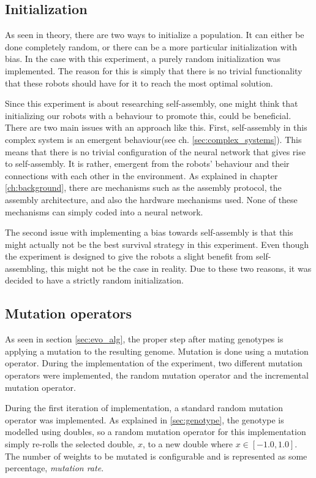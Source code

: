 \subsection{Initialization}
As seen in theory, there are two ways to initialize a population. 
It can either be done completely random, or there can be a more particular initialization with bias. 
In the case with this experiment, a purely random initialization was implemented.
The reason for this is simply that there is no trivial functionality that these robots should have for it to reach the most optimal solution.

Since this experiment is about researching self-assembly, one might think that initializing our robots with a behaviour to promote this, could be beneficial.
There are two main issues with an approach like this.
First, self-assembly in this complex system is an emergent behaviour(see ch. \ref{sec:complex_systems}).
This means that there is no trivial configuration of the neural network that gives rise to self-assembly.
It is rather, emergent from the robots' behaviour and their connections with each other in the environment.
As explained in chapter \ref{ch:background}, there are mechanisms such as the assembly protocol, the assembly architecture, and also the hardware mechanisms used.
None of these mechanisms can simply coded into a neural network.

The second issue with implementing a bias towards self-assembly is that this might actually not be the best survival strategy in this experiment.
Even though the experiment is designed to give the robots a slight benefit from self-assembling, this might not be the case in reality.
Due to these two reasons, it was decided to have a strictly random initialization.

\subsection{Mutation operators}
\label{mutation_operators}
As seen in section \ref{sec:evo_alg}, the proper step after mating genotypes is applying a mutation to the resulting genome.
Mutation is done using a mutation operator.
During the implementation of the experiment, two different mutation operators were implemented, the random mutation operator and the incremental mutation operator.

During the first iteration of implementation, a standard random mutation operator was implemented.
As explained in \ref{sec:genotype}, the genotype is modelled using doubles, so a random mutation operator for this implementation simply re-rolls the selected double, $x$, to a new double where $x \in [-1.0, 1.0]$. 
The number of weights to be mutated is configurable and is represented as some percentage, \emph{mutation rate}.

